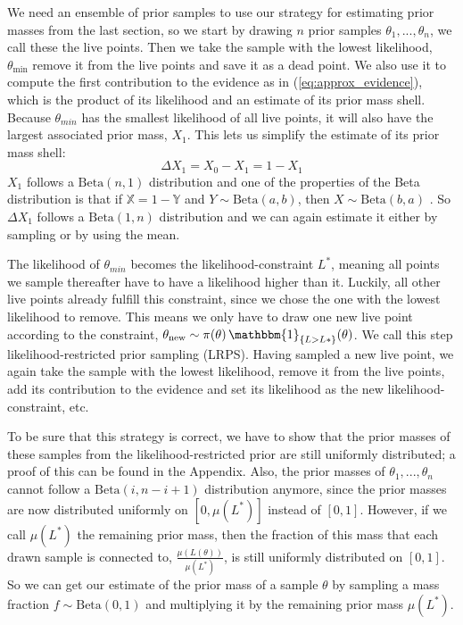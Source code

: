 \documentclass[12pt, a4paper]{report}
\begin{document}
We need an ensemble of prior samples to use our strategy for estimating prior masses from the last section, so we start by drawing $n$ prior samples $\theta_1, ..., \theta_n$, we call these the live points.
Then we take the sample with the lowest likelihood, $\theta_{\textrm{min}}$ remove it from the live points and save it as a dead point.
We also use it to compute the first contribution to the evidence as in (\ref{eq:approx_evidence}), which is the product of its likelihood and an estimate of its prior mass shell.
Because $\theta_{min}$ has the smallest likelihood of all live points, it will also have the largest associated prior mass, $X_1$. 
This lets us simplify the estimate of its prior mass shell:
$$
    \Delta X_1 = X_0 - X_1 = 1 - X_1
$$
$X_1$ follows a $\textrm{Beta}(n,1)$ distribution and one of the properties of the Beta distribution is that if $\mathbb{X} = 1 - \mathbb{Y}$ and $Y \sim \textrm{Beta}(a,b)$, then $X \sim \textrm{Beta}(b,a)$ \cite[5.17.2.]{beta_dist}.
So $\Delta X_1$ follows a $\textrm{Beta}(1,n)$ distribution and we can again estimate it either by sampling or by using the mean.

The likelihood of $\theta_{min}$ becomes the likelihood-constraint $L^*$, meaning all points we sample thereafter have to have a likelihood higher than it.
Luckily, all other live points already fulfill this constraint, since we chose the one with the lowest likelihood to remove.
This means we only have to draw one new live point according to the constraint, $\theta_{\textrm{new}} \sim \pi(\theta) \, \mathbbm{1}_{\{L > L*\}}(\theta)$.
We call this step likelihood-restricted prior sampling (LRPS).
Having sampled a new live point, we again take the sample with the lowest likelihood, remove it from the live points, add its contribution to the evidence and set its likelihood as the new likelihood-constraint, etc.

To be sure that this strategy is correct, we have to show that the prior masses of these samples from the likelihood-restricted prior are still uniformly distributed; a proof of this can be found in the Appendix.
Also, the prior masses of $\theta_1, ..., \theta_n$ cannot follow a $\textrm{Beta}(i, n-i+1)$ distribution anymore, since the prior masses are now distributed uniformly on $[0,\mu(L^*)]$ instead of $[0,1]$.
However, if we call $\mu(L^*)$ the remaining prior mass, then the fraction of this mass that each drawn sample is connected to, $\frac{\mu(L(\theta))}{\mu(L^*)}$, is still uniformly distributed on $[0,1]$.
So we can get our estimate of the prior mass of a sample $\theta$ by sampling a mass fraction $f \sim \textrm{Beta}(0,1)$ and multiplying it by the remaining prior mass $\mu(L^*)$.
\end{document}
